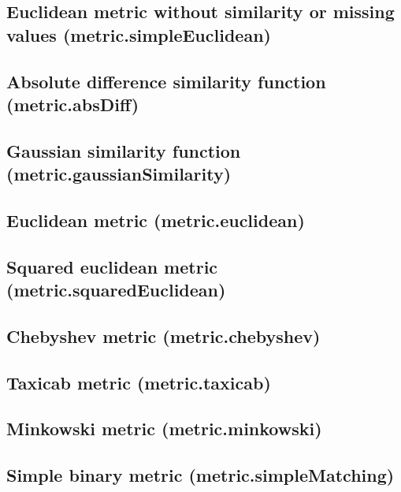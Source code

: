\documentclass{article}
\theoremstyle{definition}
\begin{document}
\subsection{Euclidean metric without similarity or missing values (metric.simpleEuclidean)}

\subsection{Absolute difference similarity function (metric.absDiff)}

\subsection{Gaussian similarity function (metric.gaussianSimilarity)}

\subsection{Euclidean metric (metric.euclidean)}

\subsection{Squared euclidean metric (metric.squaredEuclidean)}

\subsection{Chebyshev metric (metric.chebyshev)}

\subsection{Taxicab metric (metric.taxicab)}

\subsection{Minkowski metric (metric.minkowski)}

\subsection{Simple binary metric (metric.simpleMatching)}
\end{document}
